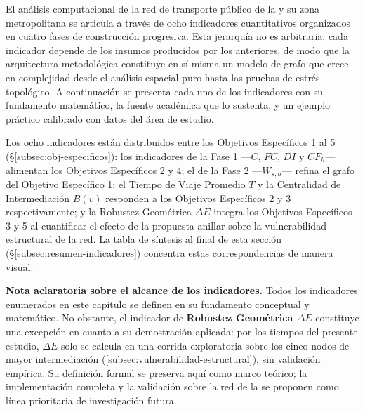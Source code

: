 

El análisis computacional de la red de transporte público de la \cdmx{} y su
zona metropolitana se articula a través de ocho indicadores cuantitativos
organizados en cuatro fases de construcción progresiva. Esta jerarquía no es
arbitraria: cada indicador depende de los insumos producidos por los anteriores,
de modo que la arquitectura metodológica constituye en sí misma un modelo de
grafo que crece en complejidad desde el análisis espacial puro hasta las pruebas
de estrés topológico. A continuación se presenta cada uno de los indicadores con
su fundamento matemático, la fuente académica que lo sustenta, y un ejemplo
práctico calibrado con datos del área de estudio.

Los ocho indicadores están distribuidos entre los Objetivos Específicos 1 al 5
(§\ref{subsec:obj-especificos}): los indicadores de la Fase 1 ---$C$, $FC$, $DI$
y $CF_h$--- alimentan los Objetivos Específicos 2 y 4; el de la Fase 2
---$W_{s,h}$--- refina el grafo del Objetivo Específico 1; el Tiempo de Viaje
Promedio $T$ y la Centralidad de Intermediación $B(v)$ responden a los Objetivos
Específicos 2 y 3 respectivamente; y la Robustez Geométrica $\Delta E$ integra
los Objetivos Específicos 3 y 5 al cuantificar el efecto de la propuesta anillar
sobre la vulnerabilidad estructural de la red. La tabla de síntesis al final de
esta sección (§\ref{subsec:resumen-indicadores}) concentra estas
correspondencias de manera visual.

\bigskip
\noindent\textbf{Nota aclaratoria sobre el alcance de los indicadores.}
Todos los indicadores enumerados en este capítulo se definen en su fundamento
conceptual y matemático. No obstante, el indicador de
\textbf{Robustez Geométrica $\Delta E$} constituye una excepción en cuanto a su
demostración aplicada: por los tiempos del presente estudio, $\Delta E$ solo se
calcula en una corrida exploratoria sobre los cinco nodos de mayor
intermediación (\autoref{subsec:vulnerabilidad-estructural}), sin validación
empírica. Su definición formal se preserva aquí como marco teórico; la
implementación completa y la validación sobre la red de la \zmvm{} se proponen
como línea prioritaria de investigación futura.
